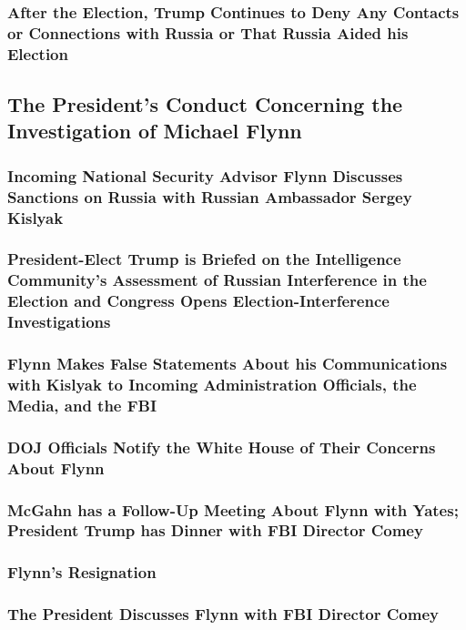 \subsubsection{After the Election, Trump Continues to Deny Any Contacts or Connections with Russia or That Russia Aided his Election}

\subsection{The President's Conduct Concerning the Investigation of Michael Flynn}

\subsubsection{Incoming National Security Advisor Flynn Discusses Sanctions on Russia with Russian Ambassador Sergey Kislyak}

\subsubsection{President-Elect Trump is Briefed on the Intelligence Community's Assessment of Russian Interference in the Election and Congress Opens Election-Interference Investigations}

\subsubsection{Flynn Makes False Statements About his Communications with Kislyak to Incoming Administration Officials, the Media, and the FBI}

\subsubsection{DOJ Officials Notify the White House of Their Concerns About Flynn}

\subsubsection{McGahn has a Follow-Up Meeting About Flynn with Yates; President Trump has Dinner with FBI Director Comey}

\subsubsection{Flynn's Resignation}

\subsubsection{The President Discusses Flynn with FBI Director Comey}

